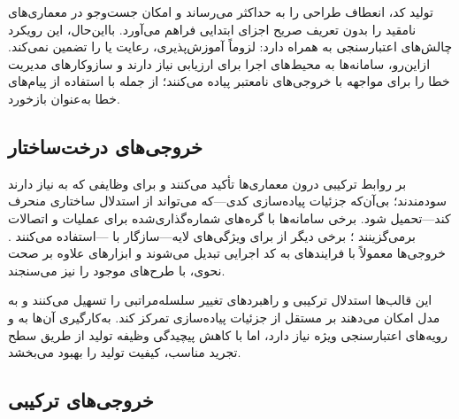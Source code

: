 تولید کد، انعطاف طراحی را به حداکثر می‌رساند و امکان جست‌وجو در معماری‌های نامقید را بدون تعریف صریح اجزای ابتدایی فراهم می‌آورد. بااین‌حال، این رویکرد چالش‌های اعتبارسنجی به همراه دارد:  لزوماً آموزش‌پذیری، رعایت  یا  را تضمین نمی‌کند. ازاین‌رو، سامانه‌ها به محیط‌های اجرا برای ارزیابی نیاز دارند و سازوکارهای مدیریت خطا را برای مواجهه با خروجی‌های نامعتبر پیاده می‌کنند؛ از جمله  با استفاده از پیام‌های خطا به‌عنوان بازخورد.

\subsection{خروجی‌های درخت‌ساختار}

 بر روابط ترکیبی درون معماری‌ها تأکید می‌کنند و برای وظایفی که به  نیاز دارند سودمندند؛ بی‌آن‌که جزئیات پیاده‌سازی کدی—که می‌تواند از استدلال ساختاری منحرف کند—تحمیل شود. برخی سامانه‌ها  با گره‌های شماره‌گذاری‌شده برای عملیات و اتصالات برمی‌گزینند \cite{Yang2025NADER}؛ برخی دیگر از  برای ویژگی‌های لایه—سازگار با —استفاده می‌کنند \cite{Yu2025GPTNAS}. خروجی‌ها معمولاً با فرایندهای  به کد اجرایی تبدیل می‌شوند و ابزارهای  علاوه بر صحت نحوی،  با طرح‌های موجود را نیز می‌سنجند.

این قالب‌ها استدلال ترکیبی و راهبردهای تغییر سلسله‌مراتبی را تسهیل می‌کنند و به مدل امکان می‌دهند بر  مستقل از جزئیات پیاده‌سازی تمرکز کند. به‌کارگیری آن‌ها به  و رویه‌های اعتبارسنجی ویژه نیاز دارد، اما با کاهش پیچیدگی وظیفه تولید از طریق سطح تجرید مناسب، کیفیت تولید را بهبود می‌بخشد.

\subsection{خروجی‌های ترکیبی}

